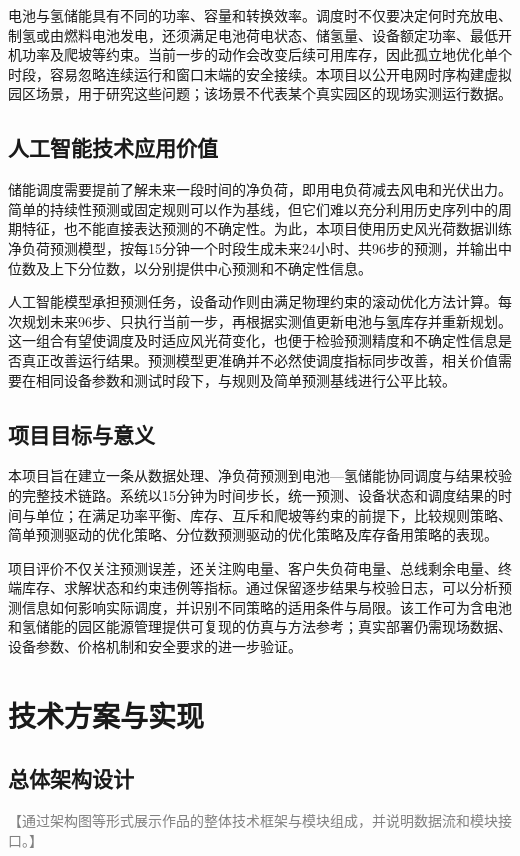\documentclass[UTF8,a4paper,zihao=-4]{ctexart}
\newcommand{\fillhint}[1]{\textcolor{gray}{【#1】}}
\begin{document}
电池与氢储能具有不同的功率、容量和转换效率。调度时不仅要决定何时充放电、制氢或由燃料电池发电，还须满足电池荷电状态、储氢量、设备额定功率、最低开机功率及爬坡等约束。当前一步的动作会改变后续可用库存，因此孤立地优化单个时段，容易忽略连续运行和窗口末端的安全接续。本项目以公开电网时序构建虚拟园区场景，用于研究这些问题；该场景不代表某个真实园区的现场实测运行数据。

\subsection{人工智能技术应用价值}
储能调度需要提前了解未来一段时间的净负荷，即用电负荷减去风电和光伏出力。简单的持续性预测或固定规则可以作为基线，但它们难以充分利用历史序列中的周期特征，也不能直接表达预测的不确定性。为此，本项目使用历史风光荷数据训练净负荷预测模型，按每15分钟一个时段生成未来24小时、共96步的预测，并输出中位数及上下分位数，以分别提供中心预测和不确定性信息。

人工智能模型承担预测任务，设备动作则由满足物理约束的滚动优化方法计算。每次规划未来96步、只执行当前一步，再根据实测值更新电池与氢库存并重新规划。这一组合有望使调度及时适应风光荷变化，也便于检验预测精度和不确定性信息是否真正改善运行结果。预测模型更准确并不必然使调度指标同步改善，相关价值需要在相同设备参数和测试时段下，与规则及简单预测基线进行公平比较。

\subsection{项目目标与意义}
本项目旨在建立一条从数据处理、净负荷预测到电池—氢储能协同调度与结果校验的完整技术链路。系统以15分钟为时间步长，统一预测、设备状态和调度结果的时间与单位；在满足功率平衡、库存、互斥和爬坡等约束的前提下，比较规则策略、简单预测驱动的优化策略、分位数预测驱动的优化策略及库存备用策略的表现。

项目评价不仅关注预测误差，还关注购电量、客户失负荷电量、总线剩余电量、终端库存、求解状态和约束违例等指标。通过保留逐步结果与校验日志，可以分析预测信息如何影响实际调度，并识别不同策略的适用条件与局限。该工作可为含电池和氢储能的园区能源管理提供可复现的仿真与方法参考；真实部署仍需现场数据、设备参数、价格机制和安全要求的进一步验证。

\section{技术方案与实现}
\subsection{总体架构设计}
\fillhint{通过架构图等形式展示作品的整体技术框架与模块组成，并说明数据流和模块接口。}
\end{document}
